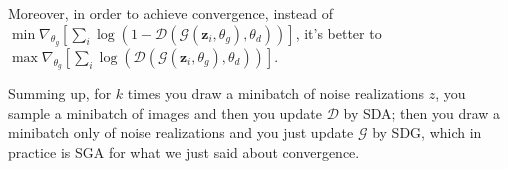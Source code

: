 Moreover, in order to achieve convergence, instead of  $\min \nabla_{\theta_{g}}\left[\sum_{i} \log \left(1-\mathcal{D}\left(\mathcal{G}\left(\mathbf{z}_{i}, \theta_{g}\right), \theta_{d}\right)\right)\right]$, it's better to  %
$\max \nabla_{\theta_{g}}\left[\sum_{i} \log \left(\mathcal{D}\left(\mathcal{G}\left(\mathbf{z}_{i}, \theta_{g}\right), \theta_{d}\right)\right)\right]$.

Summing up, for $k$ times you draw a minibatch of noise realizations $z$, you sample a minibatch of images and then you update $\mathcal{D}$ by SDA; then you draw a minibatch only of noise realizations and you just update $\mathcal{G}$ by SDG, which in practice is SGA for what we just said about convergence. \\

